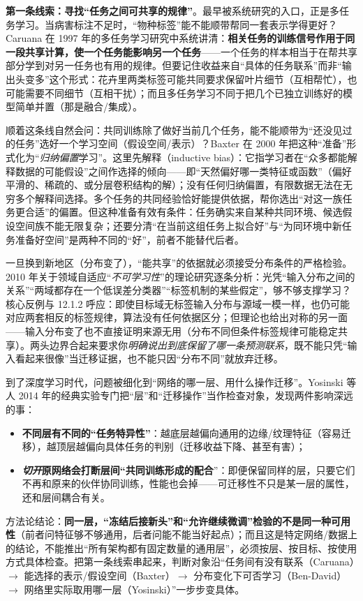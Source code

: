 \textbf{第一条线索：寻找“任务之间可共享的规律”}。最早被系统研究的入口，正是多任务学习。当病害标注不足时，“物种标签”能不能顺带帮同一套表示学得更好？Caruana 在 1997 年的多任务学习研究中系统讲清：\textbf{相关任务的训练信号作用于同一段共享计算，使一个任务能影响另一个任务}——一个任务的样本相当于在帮共享部分学到对另一任务也有用的规律。但要记住收益来自“具体的任务联系”而非“输出头变多”这个形式：花卉里两类标签可能共同要求保留叶片细节（互相帮忙），也可能需要不同细节（互相干扰）；而且多任务学习不同于把几个已独立训练好的模型简单并置（那是融合/集成）。

顺着这条线自然会问：共同训练除了做好当前几个任务，能不能顺带为“还没见过的任务”选好一个学习空间（假设空间/表示）？Baxter 在 2000 年把这种“准备”形式化为“\emph{归纳偏置}学习”。这里先解释（inductive bias）：它指学习者在“众多都能解释数据的可能假设”之间作选择的倾向——即“天然偏好哪一类特征或函数”（偏好平滑的、稀疏的、或分层卷积结构的解）；没有任何归纳偏置，有限数据无法在无穷多个解释间选择。多个任务的共同经验恰好能提供依据，帮你选出“对这一族任务更合适”的偏置。但这种准备有效有条件：任务确实来自某种共同环境、候选假设空间族不能无限复杂；还要分清“在当前这组任务上拟合好”与“为同环境中新任务准备好空间”是两种不同的“好”，前者不能替代后者。

一旦换到新地区（分布变了），“能共享”的依据就必须接受分布条件的严格检验。2010 年关于领域自适应“\emph{不可学习性}”的理论研究逐条分析：光凭“输入分布之间的关系”“两域都存在一个低误差分类器”“标签机制的某些假定”，够不够支撑学习？核心反例与 12.1.2 呼应：即使目标域无标签输入分布与源域一模一样，也仍可能对应两套相反的标签规律，算法没有任何依据区分；但理论也给出对称的另一面——输入分布变了也不直接证明来源无用（分布不同但条件标签规律可能稳定共享）。两头边界合起来要求你\emph{明确说出到底保留了哪一条预测联系}，既不能只凭“输入看起来很像”当迁移证据，也不能只因“分布不同”就放弃迁移。

到了深度学习时代，问题被细化到“网络的哪一层、用什么操作迁移”。Yosinski 等人 2014 年的经典实验专门把“层”和“迁移操作”当作检查对象，发现两件影响深远的事：
\begin{itemize}\item \textbf{不同层有不同的“任务特异性”}：越底层越偏向通用的边缘/纹理特征（容易迁移），越顶层越偏向具体任务的判别（迁移收益下降、甚至有害）；\item \textbf{\emph{切开}原网络会打断层间“共同训练形成的配合}”：即便保留同样的层，只要它们不再和原来的伙伴协同训练，性能也会掉——可迁移性不只是某一层的属性，还和层间耦合有关。\end{itemize}
方法论结论：\textbf{同一层，“冻结后接新头”和“允许继续微调”检验的不是同一种可用性}（前者问特征够不够通用，后者问能不能当好起点）；而且这是特定网络/数据上的结论，不能推出“所有架构都有固定数量的通用层”，必须按层、按目标、按使用方式具体检查。把第一条线索串起来，判断对象沿“任务间有没有联系（Caruana）$\to$ 能选择的表示/假设空间（Baxter）$\to$ 分布变化下可否学习（Ben-David）$\to$ 网络里实际取用哪一层（Yosinski）”一步步变具体。

